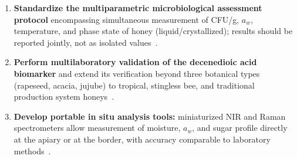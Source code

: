 \begin{enumerate}
    \item \textbf{Standardize the multiparametric microbiological
          assessment protocol} encompassing simultaneous measurement
          of CFU/g, $a_w$, temperature, and phase state of honey
          (liquid/crystallized); results should be reported
          jointly, not as isolated values~\cite{zamora2006,analytica2020}.
    \item \textbf{Perform multilaboratory validation of the
          decenedioic acid biomarker} and extend its verification
          beyond three botanical types (rapeseed, acacia, jujube)
          to tropical, stingless bee, and traditional production
          system honeys~\cite{sun2021}.
    \item \textbf{Develop portable in situ analysis tools:}
          miniaturized NIR and Raman spectrometers allow
          measurement of moisture, $a_w$, and sugar profile
          directly at the apiary or at the border, with accuracy
          comparable to laboratory
          methods~\cite{honeyid2025,schoder2026}.
\end{enumerate}
